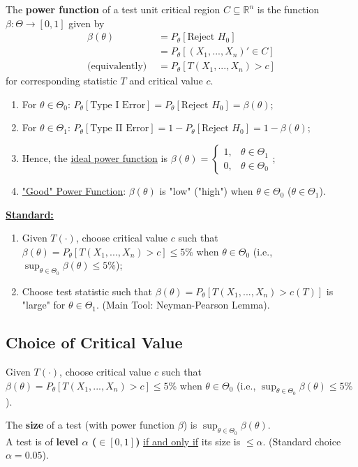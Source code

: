 \documentclass[11pt]{elegantbook}
\begin{document}
\begin{definition}
    \normalfont
    The \textbf{power function} of a test unit critical region $C\subseteq \mathbb{R}^n$ is the function $\beta:\Theta \rightarrow [0,1]$ given by
    \begin{equation}
        \begin{aligned}
            \beta(\theta)&=P_\theta[\text{Reject $H_0$}]\\
            &=P_\theta[(X_1,...,X_n)'\in C]\\
            \text{(equivalently) }&=P_\theta[T(X_1,...,X_n)>c]
        \end{aligned}
        \nonumber
    \end{equation}
    for corresponding statistic $T$ and critical value $c$.
\end{definition}
\begin{enumerate}[$\circ$]
    \item For $\theta\in\Theta_0$: $P_\theta[\text{Type I Error}]=P_\theta[\text{Reject $H_0$}]=\beta(\theta)$;
    \item For $\theta\in\Theta_1$: $P_\theta[\text{Type II Error}]=1-P_\theta[\text{Reject $H_0$}]=1-\beta(\theta)$;
    \item Hence, the \underline{ideal power function} is $\beta(\theta)=\left\{\begin{matrix}
        1,&\theta\in\Theta_1\\
        0,&\theta\in\Theta_0
    \end{matrix}\right.$;
    \item \underline{"Good" Power Function}: $\beta(\theta)$ is "low" ("high") when $\theta\in\Theta_0$ ($\theta\in\Theta_1$).
\end{enumerate}
\textbf{\underline{Standard:}}
\begin{enumerate}[(1).]
    \item Given $T(\cdot)$, choose critical value $c$ such that $\beta(\theta)=P_\theta[T(X_1,...,X_n)>c]\leq 5\%$ when $\theta\in\Theta_0$ (i.e., $\sup_{\theta\in\Theta_0}\beta(\theta)\leq 5\%$);
    \item Choose test statistic such that $\beta(\theta)=P_\theta[T(X_1,...,X_n)>c(T)]$ is "large" for $\theta\in\Theta_1$. (Main Tool: Neyman-Pearson Lemma).
\end{enumerate}


\subsection{Choice of Critical Value}
Given $T(\cdot)$, choose critical value $c$ such that $\beta(\theta)=P_\theta[T(X_1,...,X_n)>c]\leq 5\%$ when $\theta\in\Theta_0$ (i.e., $\sup_{\theta\in\Theta_0}\beta(\theta)\leq 5\%$).
\begin{definition}
    \normalfont
    The \textbf{size} of a test (with power function $\beta$) is $\sup_{\theta\in\Theta_0}\beta(\theta)$.\\
    A test is of \textbf{level $\alpha$ ($\in[0,1]$)} \underline{if and only if} its size is $\leq \alpha$. (Standard choice $\alpha=0.05$).
\end{definition}
\end{document}

